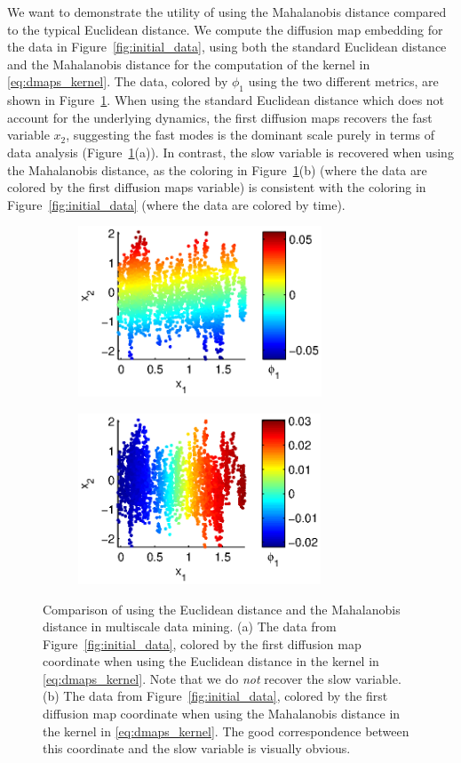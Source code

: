 We want to demonstrate the utility of using the Mahalanobis distance compared to the typical Euclidean distance.
%
We compute the diffusion map embedding for the data in Figure~\ref{fig:initial_data},
using both the standard Euclidean distance and the Mahalanobis distance for the computation of the kernel in \eqref{eq:dmaps_kernel}.
%
The data, colored by $\phi_1$ using the two different metrics, are shown in Figure~\ref{fig:NIV_versus_DMAPS}.
%
When using the standard Euclidean distance which does not account for the underlying dynamics, the first diffusion maps recovers the fast variable $x_2$, suggesting the fast modes is the dominant scale purely in terms of data analysis (Figure~\ref{fig:NIV_versus_DMAPS}(a)).
%
In contrast, the slow variable is recovered when using the Mahalanobis distance, as the coloring in Figure~\ref{fig:NIV_versus_DMAPS}(b) (where the data are colored by the first diffusion maps variable) is consistent with the coloring in Figure~\ref{fig:initial_data} (where the data are colored by time).

\begin{figure}[t]
\centering
\begin{subfigure}{0.4\textwidth}
\centering
\includegraphics[height=2in]{data_linear_DMAPS}
\caption{}
\end{subfigure}
\begin{subfigure}{0.4\textwidth}
\centering
\includegraphics[height=2in]{data_linear_NIV}
\caption{}
\end{subfigure}
%
\caption[Comparison of using the Euclidean distance and the Mahalanobis distance in multiscale data mining]{Comparison of using the Euclidean distance and the Mahalanobis distance in multiscale data mining. (a) The data from Figure~\ref{fig:initial_data}, colored by the first diffusion map coordinate when using the Euclidean distance in the kernel in \eqref{eq:dmaps_kernel}. Note that we do {\em not} recover the slow variable. (b) The data from Figure~\ref{fig:initial_data}, colored by the first diffusion map coordinate when using the Mahalanobis distance in the kernel in \eqref{eq:dmaps_kernel}. The good correspondence between this coordinate and the slow variable is visually obvious.}
\label{fig:NIV_versus_DMAPS}
\end{figure}

